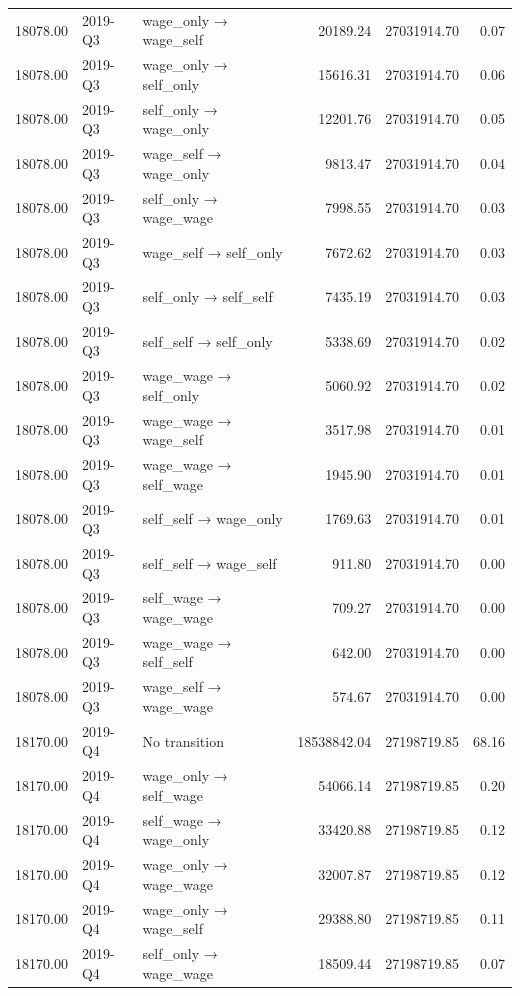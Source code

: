 \begin{table}[ht]
{\begin{tabular}{rllrrr}
  18078.00 & 2019-Q3 & wage\_only → wage\_self & 20189.24 & 27031914.70 & 0.07 \\ 
  18078.00 & 2019-Q3 & wage\_only → self\_only & 15616.31 & 27031914.70 & 0.06 \\ 
  18078.00 & 2019-Q3 & self\_only → wage\_only & 12201.76 & 27031914.70 & 0.05 \\ 
  18078.00 & 2019-Q3 & wage\_self → wage\_only & 9813.47 & 27031914.70 & 0.04 \\ 
  18078.00 & 2019-Q3 & self\_only → wage\_wage & 7998.55 & 27031914.70 & 0.03 \\ 
  18078.00 & 2019-Q3 & wage\_self → self\_only & 7672.62 & 27031914.70 & 0.03 \\ 
  18078.00 & 2019-Q3 & self\_only → self\_self & 7435.19 & 27031914.70 & 0.03 \\ 
  18078.00 & 2019-Q3 & self\_self → self\_only & 5338.69 & 27031914.70 & 0.02 \\ 
  18078.00 & 2019-Q3 & wage\_wage → self\_only & 5060.92 & 27031914.70 & 0.02 \\ 
  18078.00 & 2019-Q3 & wage\_wage → wage\_self & 3517.98 & 27031914.70 & 0.01 \\ 
  18078.00 & 2019-Q3 & wage\_wage → self\_wage & 1945.90 & 27031914.70 & 0.01 \\ 
  18078.00 & 2019-Q3 & self\_self → wage\_only & 1769.63 & 27031914.70 & 0.01 \\ 
  18078.00 & 2019-Q3 & self\_self → wage\_self & 911.80 & 27031914.70 & 0.00 \\ 
  18078.00 & 2019-Q3 & self\_wage → wage\_wage & 709.27 & 27031914.70 & 0.00 \\ 
  18078.00 & 2019-Q3 & wage\_wage → self\_self & 642.00 & 27031914.70 & 0.00 \\ 
  18078.00 & 2019-Q3 & wage\_self → wage\_wage & 574.67 & 27031914.70 & 0.00 \\ 
  18170.00 & 2019-Q4 & No transition & 18538842.04 & 27198719.85 & 68.16 \\ 
  18170.00 & 2019-Q4 & wage\_only → self\_wage & 54066.14 & 27198719.85 & 0.20 \\ 
  18170.00 & 2019-Q4 & self\_wage → wage\_only & 33420.88 & 27198719.85 & 0.12 \\ 
  18170.00 & 2019-Q4 & wage\_only → wage\_wage & 32007.87 & 27198719.85 & 0.12 \\ 
  18170.00 & 2019-Q4 & wage\_only → wage\_self & 29388.80 & 27198719.85 & 0.11 \\ 
  18170.00 & 2019-Q4 & self\_only → wage\_wage & 18509.44 & 27198719.85 & 0.07 \\ 

\end{tabular}}
\end{table}

